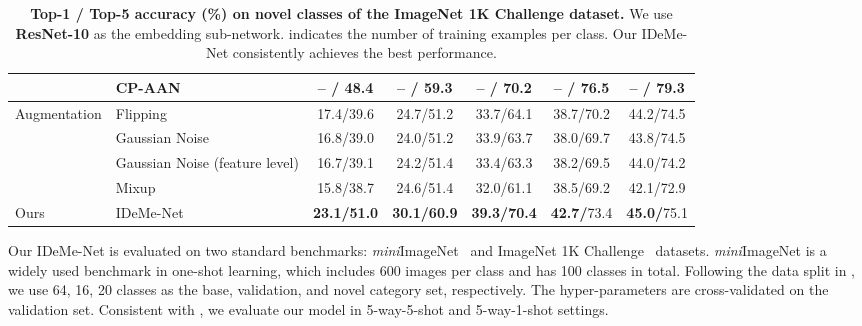 \documentclass[10pt,letterpaper,twocolumn]{article}
\providecommand{\tabularnewline}{\\}
\begin{document}
\begin{table*}
\begin{centering}
\begin{tabular}{llccccc}
 & {\small{}{}CP-AAN~\cite{cogan} } & {\small{}{}-- / {}48.4 } & {\small{}{}-- / {}59.3 } & {\small{}{}-- / {}70.2 } & {\small{}{}-- / {}\textbf{\small{}{}{}{}76.5} } &  {\small{}{}{}-- / }\textbf{\small{}{}{}{}79.3}\tabularnewline
\hline 
\multirow{4}{*}{{\small{}Augmentation }} & {\small{}{}{}{}{}{}Flipping  } & {\small{}{}{}{}{}{}17.4/39.6  } & {\small{}{}{}{}{}{}24.7/51.2  } & {\small{}{}{}{}{}{}33.7/64.1  } & {\small{}{}{}{}{}{}38.7/70.2  } & {\small{}{}{}{}{}{}44.2/74.5 }\tabularnewline
 & {\small{}{}{}{}{}{}Gaussian Noise  } & {\small{}{}{}{}{}{}16.8/39.0  } & {\small{}{}{}{}{}{}24.0/51.2  } & {\small{}{}{}{}{}{}33.9/63.7  } & {\small{}{}{}{}{}{}38.0/69.7  } & {\small{}{}{}{}{}{}43.8/74.5 }\tabularnewline
 & {\small{}{}{}Gaussian Noise (feature level)  } & {\small{}{}{}{}{}{}16.7/39.1  } & {\small{}{}{}{}{}{}24.2/51.4  } & {\small{}{}{}{}{}{}33.4/63.3  } & {\small{}{}{}{}{}{}38.2/69.5  } & {\small{}{}{}{}{}{}44.0/74.2 }\tabularnewline
 & {\small{}{}{}{}{}{}Mixup~\cite{mixup}} & {\small{}{}{}{}{}{}15.8/38.7  } & {\small{}{}{}{}{}{}24.6/51.4  } & {\small{}{}{}{}{}{}32.0/61.1  } & {\small{}{}{}{}{}{}38.5/69.2  } & {\small{}{}{}{}{}{}42.1/72.9 }\tabularnewline
\hline 
\hline 
{\small{}Ours  } & {\small{}{}{}{}{}{}IDeMe-Net  } & \textbf{\small{}{}{}{}{}{}{}23.1/51.0}{\small{}{}{}{}  } & \textbf{\small{}{}30.1/60.9}{\small{}{}  } & \textbf{\small{}{}{}{}{}{}39.3/70.4}{\small{}{}  } & \textbf{\small{}{}42.7{}/}{\small{}{}73.4  } & \textbf{\small{}{}{}{}{}{}45.0{}/}{\small{}{}{}75.1}\tabularnewline
\hline 
\end{tabular}
\vspace{0.1in}
\caption{\label{tab:Imagenet1k-resnet10}\textbf{Top-1 / Top-5 accuracy (\%)
on novel classes of the ImageNet 1K Challenge dataset.} We use \textbf{ResNet-10}
as the embedding sub-network.  indicates the number of training
examples per class.  Our IDeMe-Net consistently achieves the best performance.}\par\end{centering}


\end{table*}

Our IDeMe-Net is evaluated on two standard benchmarks: \emph{mini}ImageNet~\cite{matchingnet_1shot}
and ImageNet 1K Challenge~\cite{2017ICCVaug} datasets. \emph{mini}ImageNet
is a widely used benchmark in one-shot learning, which includes 600
images per class and has 100 classes in total. Following the data
split in \cite{Sachin2017}, we use 64, 16, 20 classes as the base,
validation, and novel category set, respectively. The hyper-parameters
are cross-validated on the validation set. Consistent with \cite{matchingnet_1shot,Sachin2017}, we evaluate our model in 5-way-5-shot and
5-way-1-shot settings.
\end{document}
